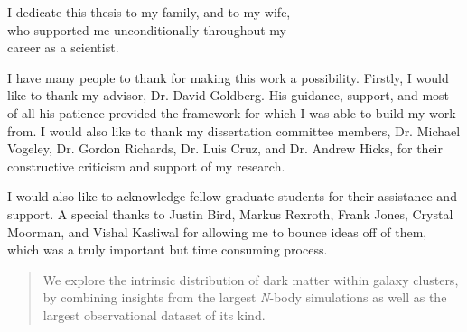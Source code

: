 \begin{preamble}

\iffinal{}{\newpage}

\begin{DUTdedications}
\begin{center}

I dedicate this thesis to my family, and to my wife,\\
who supported me unconditionally throughout my \\
career as a scientist.\\

\end{center}
\end{DUTdedications}

\iffinal{}{\newpage}

\begin{acknowledgments}
I have many people to thank for making this work a
possibility. Firstly, I would like to thank my advisor, Dr. David
Goldberg. His guidance, support, and most of all his patience provided
the framework for which I was able to build my work from. I would also
like to thank my dissertation committee members, Dr. Michael Vogeley,
Dr. Gordon Richards, Dr. Luis Cruz, and Dr. Andrew Hicks, for their
constructive criticism and support of my research.

I would also like to acknowledge fellow graduate students for their
assistance and support. A special thanks to Justin Bird, Markus
Rexroth, Frank Jones, Crystal Moorman, and Vishal Kasliwal for
allowing me to bounce ideas off of them, which was a truly important
but time consuming process.
\end{acknowledgments}

\iffinal{}{\newpage}

\tableofcontents 
\iffinal{}{\newpage}

\listoftables
\iffinal{}{\newpage}

\listoffigures 
\iffinal{}{\newpage}

\begin{abstract}


We explore the intrinsic distribution of dark matter within galaxy
clusters, by combining insights from the largest {\em N}-body
simulations as well as the largest observational dataset of its kind.
  

\end{abstract}
\end{preamble}
